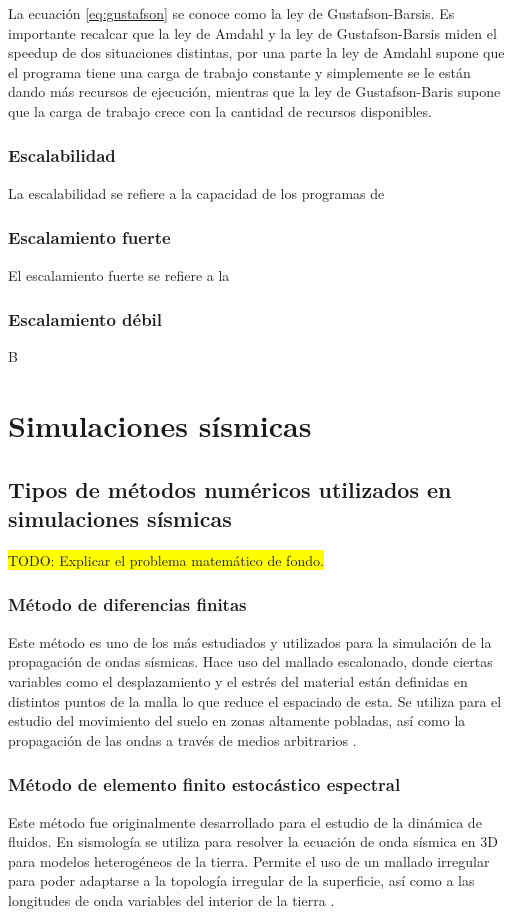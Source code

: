 La ecuación \ref{eq:gustafson} se conoce como la ley de Gustafson-Barsis. Es importante recalcar que la ley de Amdahl y la ley de Gustafson-Barsis miden el speedup de dos situaciones distintas, por una parte la ley de Amdahl supone que el programa tiene una carga de trabajo constante y simplemente se le están dando más recursos de ejecución, mientras que la ley de Gustafson-Baris supone que la carga de trabajo crece con la cantidad de recursos disponibles.
\subsubsection{Escalabilidad}
La escalabilidad se refiere a la capacidad de los programas de 
\subsubsection{Escalamiento fuerte}
El escalamiento fuerte se refiere a la 
\subsubsection{Escalamiento débil}
B
\section{Simulaciones sísmicas}
\subsection{Tipos de métodos numéricos utilizados en simulaciones sísmicas}
\colorbox{yellow}{TODO: Explicar el problema matemático de fondo.}
\subsubsection{Método de diferencias finitas}
Este método es uno de los más estudiados y utilizados para la simulación de la propagación de ondas sísmicas. Hace uso del mallado escalonado, donde ciertas variables como el desplazamiento y el estrés del material están definidas en distintos puntos de la malla lo que reduce el espaciado de esta. Se utiliza para el estudio del movimiento del suelo en zonas altamente pobladas, así como la propagación de las ondas a través de medios arbitrarios \cite{Fichtner2011}.
\subsubsection{Método de elemento finito estocástico espectral}
Este método fue originalmente desarrollado para el estudio de la dinámica de fluidos. En sismología se utiliza para resolver la ecuación de onda sísmica en 3D para modelos heterogéneos de la tierra. Permite el uso de un mallado irregular para poder adaptarse a la topología irregular de la superficie, así como a las longitudes de onda variables del interior de la tierra \cite{Fichtner2011}.
